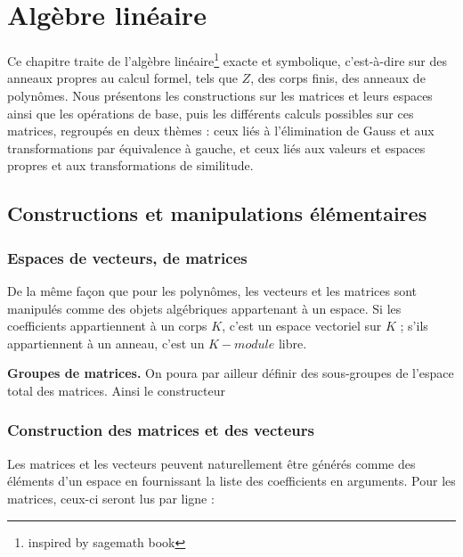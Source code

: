 \chapter{Algèbre linéaire}
Ce chapitre traite de l’algèbre linéaire\footnote{inspired by sagemath book} exacte et symbolique, c’est-à-dire sur
des anneaux propres au calcul formel, tels que $Z$, des corps finis, des anneaux de
polynômes. Nous présentons les constructions sur les matrices et leurs espaces ainsi que les
opérations de base, puis les différents calculs possibles sur ces matrices, regroupés en deux thèmes : ceux liés à l’élimination de Gauss et aux transformations par équivalence à gauche, et ceux liés aux valeurs et espaces
propres et aux transformations de similitude.
\section{Constructions et manipulations élémentaires}
\subsection{ Espaces de vecteurs, de matrices}
De la même façon que pour les polynômes, les vecteurs et les matrices sont
manipulés comme des objets algébriques appartenant à un espace. Si les coefficients
appartiennent à un corps $K$, c’est un espace vectoriel sur $K$ ; s’ils appartiennent
à un anneau, c’est un $K-module$ libre.
\begin{flushright}
\textbf{Groupes de matrices.} On poura par ailleur définir des sous-groupes de l'espace total des matrices. Ainsi le constructeur 
\end{flushright}

\subsection{ Construction des matrices et des vecteurs}
Les matrices et les vecteurs peuvent naturellement être générés comme des éléments d’un espace en fournissant la liste des coefficients en arguments. Pour les matrices, ceux-ci seront lus par ligne :

